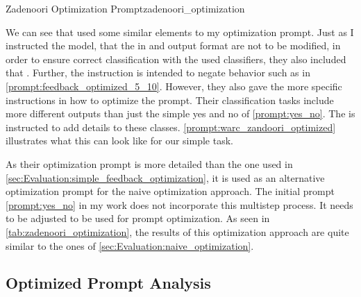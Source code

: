 \begin{prompt}{Zadenoori Optimization Prompt}{zadenoori_optimization}
    \\
    
\end{prompt}

We can see that \citeauthor{zadenoori2025AutomaticPrompt} used some similar elements to my optimization prompt.
Just as I instructed the model, that the in and output format are not to be modified, in order to ensure correct classification with the used classifiers, they also included that .
Further, the instruction  is intended to negate behavior such as in \autoref{prompt:feedback_optimized_5_10}.
However, they also gave the \LLM more specific instructions in how to optimize the prompt.
Their classification tasks include more different outputs than just the simple yes and no of \autoref{prompt:yes_no}.
The \LLM is instructed to add details to these classes.
\autoref{prompt:warc_zandoori_optimized} illustrates what this can look like for our simple \TLR \RtR task.

As their optimization prompt is more detailed than the one used in \autoref{sec:Evaluation:simple_feedback_optimization}, it is used as an alternative optimization prompt for the naive optimization approach.
The initial prompt \autoref{prompt:yes_no} in my work does not incorporate this multistep process.
It needs to be adjusted to be used for \RtR prompt optimization.
As seen in \autoref{tab:zadenoori_optimization}, the results of this optimization approach are quite similar to the ones of \autoref{sec:Evaluation:naive_optimization}.

\subsection{Optimized Prompt Analysis}
\label{subsec:Evaluation:varying-the-optimization-prompt:optimized-prompt-analysis}


